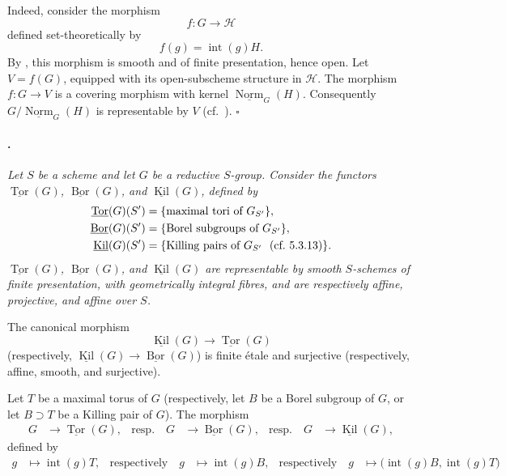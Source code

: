 Indeed, consider the morphism
\[
  f\colon G\longrightarrow\mathcal H
\]
defined set-theoretically by
\[
  f(g)=\operatorname{int}(g)H.
\]
By , this morphism is smooth and of finite presentation, hence
open. Let \(V=f(G)\), equipped with its open-subscheme structure in
\(\mathcal H\). The morphism \(f\colon G\to V\) is a covering
morphism with kernel \(\underline{\operatorname{Norm}}_G(H)\).
Consequently
\(G/\underline{\operatorname{Norm}}_G(H)\) is representable by
\(V\) \textup{(cf.\ )}.
\hfill\(\square\)

\paragraph{.}
{\itshape Let \(S\) be a scheme and let \(G\) be a reductive
\(S\)-group. Consider the functors
\(\underline{\operatorname{Tor}}(G)\),
\(\underline{\operatorname{Bor}}(G)\), and
\(\underline{\operatorname{Kil}}(G)\), defined by
\[
\begin{aligned}
  \underline{\operatorname{Tor}}(G)(S')
  &=
  \{\text{maximal tori of \(G_{S'}\)}\},\\
  \underline{\operatorname{Bor}}(G)(S')
  &=
  \{\text{Borel subgroups of \(G_{S'}\)}\},\\
  \underline{\operatorname{Kil}}(G)(S')
  &=
  \{\text{Killing pairs of \(G_{S'}\)
  \textup{ (cf.\ 5.3.13)}}\}.
\end{aligned}
\]
\textup{}
\(\underline{\operatorname{Tor}}(G)\),
\(\underline{\operatorname{Bor}}(G)\), and
\(\underline{\operatorname{Kil}}(G)\) are representable by smooth
\(S\)-schemes of finite presentation, with geometrically integral
fibres, and are respectively affine, projective, and affine over
\(S\).

\textup{}
The canonical morphism
\[
  \underline{\operatorname{Kil}}(G)
  \longrightarrow
  \underline{\operatorname{Tor}}(G)
\]
\textup{(respectively,
\(\underline{\operatorname{Kil}}(G)\to
\underline{\operatorname{Bor}}(G)\))}
is finite étale and surjective
\textup{(respectively, affine, smooth, and surjective)}.

\textup{}
Let \(T\) be a maximal torus of \(G\)
\textup{(respectively, let \(B\) be a Borel subgroup of \(G\), or
let \(B\supset T\) be a Killing pair of \(G\))}. The morphism
\[
\begin{aligned}
  G&\longrightarrow\underline{\operatorname{Tor}}(G),
  &\text{resp.}\quad
  G&\longrightarrow\underline{\operatorname{Bor}}(G),
  &\text{resp.}\quad
  G&\longrightarrow\underline{\operatorname{Kil}}(G),
\end{aligned}
\]
defined by
\[
\begin{aligned}
  g&\longmapsto\operatorname{int}(g)T,
  &\text{respectively}\quad
  g&\longmapsto\operatorname{int}(g)B,
  &\text{respectively}\quad
  g&\longmapsto
  \bigl(\operatorname{int}(g)B,\operatorname{int}(g)T\bigr)
\end{aligned}
\]}

